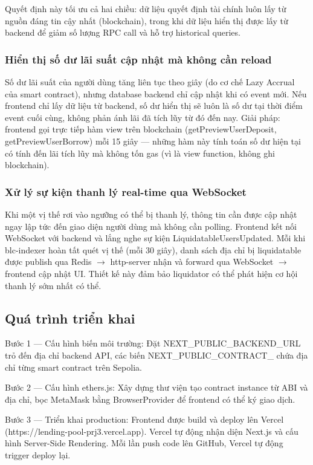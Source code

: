\documentclass[../DoAn.tex]{subfiles}
\begin{document}
Quyết định này tối ưu cả hai chiều: dữ liệu quyết định tài chính luôn lấy từ nguồn đáng tin cậy nhất (blockchain), trong khi dữ liệu hiển thị được lấy từ backend để giảm số lượng RPC call và hỗ trợ historical queries.

\subsubsection{Hiển thị số dư lãi suất cập nhật mà không cần reload}


Số dư lãi suất của người dùng tăng liên tục theo giây (do cơ chế Lazy Accrual của smart contract), nhưng database backend chỉ cập nhật khi có event mới. Nếu frontend chỉ lấy dữ liệu từ backend, số dư hiển thị sẽ luôn là số dư tại thời điểm event cuối cùng, không phản ánh lãi đã tích lũy từ đó đến nay. Giải pháp: frontend gọi trực tiếp hàm view trên blockchain (getPreviewUserDeposit, getPreviewUserBorrow) mỗi 15 giây --- những hàm này tính toán số dư hiện tại có tính đến lãi tích lũy mà không tốn gas (vì là view function, không ghi blockchain).

\subsubsection{Xử lý sự kiện thanh lý real-time qua WebSocket}


Khi một vị thế rơi vào ngưỡng có thể bị thanh lý, thông tin cần được cập nhật ngay lập tức đến giao diện người dùng mà không cần polling. Frontend kết nối WebSocket với backend và lắng nghe sự kiện LiquidatableUsersUpdated. Mỗi khi blc-indexer hoàn tất quét vị thế (mỗi 30 giây), danh sách địa chỉ bị liquidatable được publish qua Redis $\rightarrow$ http-server nhận và forward qua WebSocket $\rightarrow$ frontend cập nhật UI. Thiết kế này đảm bảo liquidator có thể phát hiện cơ hội thanh lý sớm nhất có thể.

\subsection{Quá trình triển khai}


Bước 1 --- Cấu hình biến môi trường: Đặt NEXT\_PUBLIC\_BACKEND\_URL trỏ đến địa chỉ backend API, các biến NEXT\_PUBLIC\_CONTRACT\_\* chứa địa chỉ từng smart contract trên Sepolia.

Bước 2 --- Cấu hình ethers.js: Xây dựng thư viện tạo contract instance từ ABI và địa chỉ, bọc MetaMask bằng BrowserProvider để frontend có thể ký giao dịch.

Bước 3 --- Triển khai production: Frontend được build và deploy lên Vercel (https://lending-pool-prj3.vercel.app). Vercel tự động nhận diện Next.js và cấu hình Server-Side Rendering. Mỗi lần push code lên GitHub, Vercel tự động trigger deploy lại.
\end{document}

